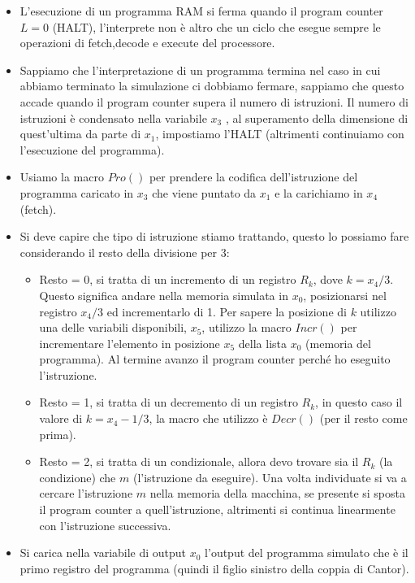 \documentclass{article}
\begin{document}
\begin{itemize}
    \item L'esecuzione di un programma RAM si ferma quando il program counter $L=0$ (HALT),
          l'interprete non è altro che un ciclo che esegue sempre le operazioni di
          fetch,decode e execute del processore.
    \item Sappiamo che l'interpretazione di un programma termina nel caso in cui
          abbiamo terminato la simulazione ci dobbiamo fermare, sappiamo che questo
          accade quando il program counter supera il numero di istruzioni. Il numero di
          istruzioni è condensato nella variabile $x_3$ , al superamento della dimensione
          di quest'ultima da parte di $x_1$, impostiamo l'HALT (altrimenti continuiamo
          con l'esecuzione del programma).
    \item Usiamo la macro $Pro()$ per prendere la codifica dell'istruzione del programma
          caricato in $x_3$ che viene puntato da $x_1$ e la carichiamo in $x_4$ (fetch).
    \item Si deve capire che tipo di istruzione stiamo trattando, questo lo possiamo
          fare considerando il resto della divisione per 3:
          \begin{itemize}
              \item Resto = 0, si tratta di un incremento di un registro $R_k$,
                    dove $k=x_4/3$. Questo significa andare nella memoria simulata in $x_0$, posizionarsi
                    nel registro $x_4/3$ ed incrementarlo di 1. Per sapere la posizione di $k$ utilizzo
                    una delle variabili disponibili, $x_5$, utilizzo la macro $Incr()$ per incrementare
                    l'elemento in posizione $x_5$ della lista $x_0$ (memoria del programma). Al termine avanzo
                    il program counter perché ho eseguito l'istruzione.
              \item Resto = 1, si tratta di un decremento di un registro $R_k$, in questo caso
                    il valore di $k=x_4-1/3$, la macro che utilizzo è $Decr()$ (per il resto come prima).
              \item Resto = 2, si tratta di un condizionale, allora devo trovare sia il $R_k$ (la condizione)
                    che $m$ (l'istruzione da eseguire). Una volta individuate si va a cercare l'istruzione
                    $m$ nella memoria della macchina, se presente si sposta il program counter a quell'istruzione,
                    altrimenti si continua linearmente con l'istruzione successiva.
          \end{itemize}
    \item Si carica nella variabile di output $x_0$ l'output del programma simulato che è
          il primo registro del programma (quindi il figlio sinistro della coppia di Cantor).
\end{itemize}
\end{document}
